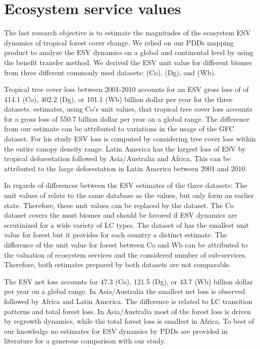 	\section{Ecosystem service values}
		The last research objective is to estimate the magnitudes of the ecosystem \ac{ESV} dynamics of tropical forest cover change. We relied on our \acp{PDD} mapping product to analyze the \ac{ESV} dynamics on a global and continental level by using the benefit transfer method. We derived the \ac{ESV} unit value for different biomes from three different commonly used datasets: \citet{Costanza2014} (Co), \citet{Groot2012} (Dg), and \citet{Siikamaki2015} (Wb).

		Tropical tree cover loss between 2001-2010 accounts for an \ac{ESV} gross loss of of 414.1 (Co), 402.2 (Dg), or 101.1 (Wb) billion dollar per year for the three datasets. \citet{Song2018} estimates, using Co's unit values, that tropical tree cover loss accounts for a gross loss of 550.7 billion dollar per year on a global range. The difference from our estimate can be attributed to variations in the usage of the \ac{GFC} dataset. For his study \ac{ESV} loss is computed by considering tree cover loss within the entire canopy density range. Latin America has the largest loss of \ac{ESV} by tropical deforestation followed by Asia/Australia and Africa. This can be attributed to the large deforestation in Latin America between 2001 and 2010.

		In regards of differences between the \ac{ESV} estimates of the three datasets: The unit values of \citet{Groot2012} relate to the same database as the \citet{Costanza2014} values, but only form an earlier state. Therefore, these unit values can be replaced by the \citet{Costanza2014} dataset. The Co dataset covers the most biomes and should be favored if \ac{ESV} dynamics are scrutinized for a wide variety of \ac{LC} types. The dataset of \citet{Siikamaki2015} has the smallest unit value for forest but it provides for each country a distinct estimate. The difference of the unit value for forest between Co and Wb can be attributed to the valuation of ecosystem services and the considered number of sub-services. Therefore, both estimates prepared by both datasets are not comparable.

		The \ac{ESV} net loss accounts for 47.3 (Co), 121.5 (Dg), or 43.7 (Wb) billion dollar per year on a global range. In Asia/Australia the smallest net loss is observed followed by Africa and Latin America. The difference is related to \ac{LC} transition patterns and total forest loss. In Asia/Australia most of the forest loss is driven by regrowth dynamics, while the total forest loss is smallest in Africa. To best of our knowledge no estimates for \ac{ESV} dynamics by \acp{PDD} are provided in literature for a generous comparison with our study.

